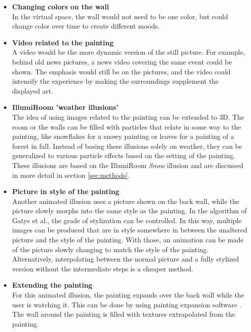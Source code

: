\documentclass[a4paper]{article}
\begin{document}
\begin{itemize}

\item{\textbf{Changing colors on the wall}}
\\In the virtual space, the wall would not need to be one color, but could change color over time to create different moods.

\item{\textbf{Video related to the painting}}
\\A video would be the more dynamic version of the still picture. For example, behind old news pictures, a news video covering the same event could be shown. The emphasis would still be on the pictures, and the video could intensify the experience by making the surroundings supplement the displayed art.

\item{\textbf{IllumiRoom 'weather illusions'}}
\\The idea of using images related to the painting can be extended to 3D. The room or the walls can be filled with particles that relate in some way to the painting, like snowflakes for a snowy painting or leaves for a painting of a forest in fall. Instead of basing these illusions solely on weather, they can be generalized to various particle effects based on the setting of the painting. These illusions are based on the IllumiRoom \emph{Snow} illusion \cite{illumiroom} and are discussed in more detail in section \ref{sec:methods}. %

\item{\textbf{Picture in style of the painting}}
\\Another animated illusion uses a picture shown on the back wall, while the picture slowly morphs into the same style as the painting. In the algorithm of Gatys et al.\cite{gatys}, the grade of stylization can be controlled. In this way, multiple images can be produced that are in style somewhere in between the unaltered picture and the style of the painting. With those, an animation can be made of the picture slowly changing to match the style of the painting. Alternatively, interpolating between the normal picture and a fully stylized version without the intermediate steps is a cheaper method.

\item{\textbf{Extending the painting}}
\\For this animated illusion, the painting expands over the back wall while the user is watching it. This can be done by using painting expansion software \cite{inpainting}. The wall around the painting is filled with textures extrapolated from the painting.

\end{itemize}
\end{document}
